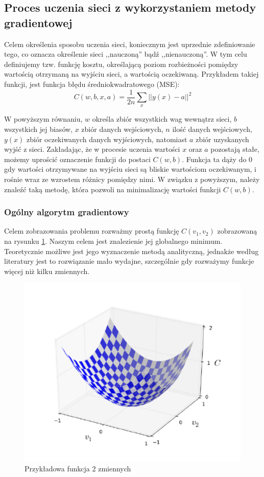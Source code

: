 \documentclass[12pt,twoside]{article}
\begin{document}
\subsection{Proces uczenia sieci z wykorzystaniem metody gradientowej}
Celem określenia sposobu uczenia sieci, koniecznym jest uprzednie zdefiniowanie tego, co oznacza określenie sieci ,,nauczoną'' bądź ,,nienauczoną''.
W tym celu definiujemy tzw. funkcję kosztu, określającą poziom rozbieżności pomiędzy wartością otrzymaną na wyjściu sieci, a wartością oczekiwaną.
Przykładem takiej funkcji, jest funkcja błędu średniokwadratowego (MSE):
\begin{equation}
	\label{eq:costFunction}
	C\left( w, b, x, a\right) = \frac{1}{2n} \sum\limits_{x} || y\left( x \right) - a ||^2
\end{equation}

W powyższym równaniu, $w$ określa zbiór wszystkich wag wewnątrz sieci, $b$ wszystkich jej biasów, $x$ zbiór danych wejściowych, $n$ ilość danych wejściowych, $y(x)$ zbiór oczekiwanych danych wyjściowych, natomiast $a$ zbiór uzyskanych wyjść z sieci.
Zakładając, że w procesie uczenia wartości $x$ oraz $a$ pozostają stałe, możemy uprościć oznaczenie funkcji do postaci $C (w,b)$.
Funkcja ta dąży do 0 gdy wartości otrzymywane na wyjściu sieci są bliskie wartościom oczekiwanym, i rośnie wraz ze wzrostem różnicy pomiędzy nimi.
W związku z powyższym, należy znaleźć taką metodę, która pozwoli na minimalizację wartości funkcji $C(w,b)$.

\subsubsection{Ogólny algorytm gradientowy}
Celem zobrazowania problemu rozważmy prostą funkcję $C(v_1, v_2)$ zobrazowaną na rysunku \ref{Fig:simpleCost}.
Naszym celem jest znalezienie jej globalnego minimum.
Teoretycznie możliwe jest jego wyznaczenie metodą analityczną, jednakże według literatury \cite{nndl} jest to rozwiązanie mało wydajne, szczególnie gdy rozważymy funkcje więcej niż kilku zmiennych.

\begin{figure}[ht]
	\centering
	\includegraphics[width=12cm]{figures/models/gradientExample.png}
	\caption{Przykładowa funkcja 2 zmiennych}
	\label{Fig:simpleCost}
\end{figure}
\end{document}
